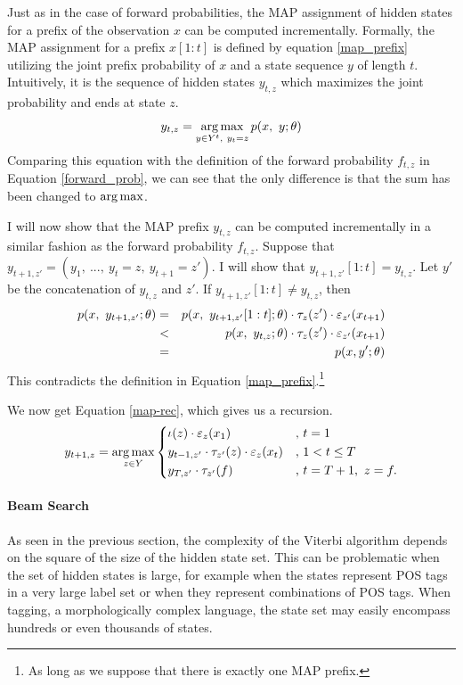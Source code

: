 Just as in the case of forward probabilities, the MAP assignment of
hidden states for a prefix of the observation $x$ can be computed
incrementally. Formally, the MAP assignment for a prefix $x[1:t]$ is
defined by equation \eqref{map_prefix} utilizing the joint prefix
probability of $x$ and a state sequence $y$ of length
$t$. Intuitively, it is the sequence of hidden states $y_{t, z}$ which
maximizes the joint probability and ends at state $z$.
\begin{equation}
y_{t,z} = \operatorname*{arg\,max}_{y\in Y^t,\ y_t = z} p(x,\ y\mbox{$ ; \, $} \theta)\label{map_prefix}
\end{equation}
Comparing this equation with the definition of the forward probability
$f_{t,z}$ in Equation \ref{forward_prob}, we can see that the only
difference is that the sum has been changed to $\operatorname*{arg\,max}$.

I will now show that the MAP prefix $y_{t,z}$ can be computed
incrementally in a similar fashion as the forward probability
$f_{t,z}$. Suppose that $y_{t+1, z'} = (y_1,\ ...,\ y_t = z,\ y_{t+1}
= z')$. I will show that $y_{t+1, z'}[1:t] = y_{t,z}$. Let $y'$ be the concatenation of $y_{t,z}$ and $z'$. If $y_{t+1,z'}[1:t] \ne y_{t,z}$, then
\begin{eqnarray*}
p(x,\ y_{t+1,z'}\parcond \theta) & = & p(x,\ y_{t+1,z'}[1:t]\parcond \theta) \cdot \tau_z(z')\cdot\varepsilon_{z'}(x_{t+1})\\ 
                                 & < & p(x,\ y_{t,z}\parcond \theta) \cdot \tau_z(z')\cdot\varepsilon_{z'}(x_{t+1})\\
                                 & = & p(x, y'\parcond\theta)
\end{eqnarray*}
This contradicts the definition in Equation \eqref{map_prefix}.\footnote{As long as we suppose that there is exactly one MAP prefix.}

We now get Equation \eqref{map-rec}, which gives us a recursion.
\begin{equation}
y_{t+1, z} = \operatorname*{arg\,max}_{z \in Y}\left\{
\begin{aligned}
&\iota(z) \cdot \varepsilon_{z}(x_1)  & , &\  t = 1\\
&y_{t - 1, z'}\cdot \tau_{z'}(z) \cdot \varepsilon_{z}(x_{t}) & ,&\ 1 < t \le T\\
&y_{T, z'}\cdot \tau_{z'}(f) & ,&\  t = T + 1,\ z = f.
\end{aligned}
\right.
\label{map-rec}
\end{equation}

\paragraph{Beam Search}
As seen in the previous section, the complexity of the Viterbi
algorithm depends on the square of the size of the hidden state
set. This can be problematic when the set of hidden states is large,
for example when the states represent POS tags in a very large label
set or when they represent combinations of POS tags. When tagging, a
morphologically complex language, the state set may easily encompass
hundreds or even thousands of states.

